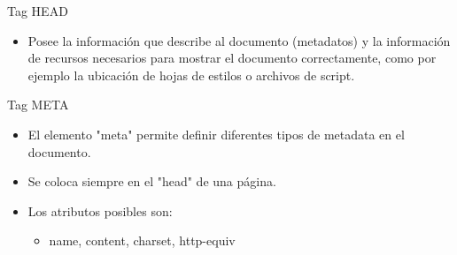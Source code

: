 \documentclass[aspectratio=43,10pt,t]{beamer}
\begin{document}
\begin{frame}{Tag HEAD}\relax
\begin{minipage}[t]{0.438\paperwidth}
\begingroup
{}
\begin{itemize}
  \item\relax Posee la información que describe al documento (metadatos) y la información de recursos necesarios para mostrar el documento correctamente, como por ejemplo la ubicación de hojas de estilos o archivos de script.
\end{itemize}
\endgroup
\end{minipage}
\end{frame}

\begin{frame}{Tag META}\relax
\begin{minipage}[t]{0.438\paperwidth}
\begingroup
{}
\begin{itemize}
  \item\relax El elemento "meta" permite definir diferentes tipos de metadata en el documento.
  \item\relax Se coloca siempre en el "head" de una página.
  \item\relax Los atributos posibles son:
  \begin{itemize}
    \item\relax name, content, charset, http-equiv
  \end{itemize}
\end{itemize}
\endgroup
\end{minipage}
\end{frame}
\end{document}
